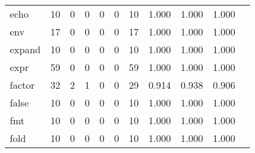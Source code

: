 \begin{longtable}{lp{1.10cm}p{1.10cm}p{1.10cm}p{1.10cm}p{1.10cm}p{1.10cm}p{1.10cm}p{1.10cm}p{1.10cm}p{1.10cm}}
echo      &                     10 &                                  0 &                                 0 &                                0 &                                 0 &                              10 &                          1.000 &                                 1.000 &                               1.000 \\
env       &                     17 &                                  0 &                                 0 &                                0 &                                 0 &                              17 &                          1.000 &                                 1.000 &                               1.000 \\
expand    &                     10 &                                  0 &                                 0 &                                0 &                                 0 &                              10 &                          1.000 &                                 1.000 &                               1.000 \\
expr      &                     59 &                                  0 &                                 0 &                                0 &                                 0 &                              59 &                          1.000 &                                 1.000 &                               1.000 \\
factor    &                     32 &                                  2 &                                 1 &                                0 &                                 0 &                              29 &                          0.914 &                                 0.938 &                               0.906 \\
false     &                     10 &                                  0 &                                 0 &                                0 &                                 0 &                              10 &                          1.000 &                                 1.000 &                               1.000 \\
fmt       &                     10 &                                  0 &                                 0 &                                0 &                                 0 &                              10 &                          1.000 &                                 1.000 &                               1.000 \\
fold      &                     10 &                                  0 &                                 0 &                                0 &                                 0 &                              10 &                          1.000 &                                 1.000 &                               1.000 \\

\end{longtable}
